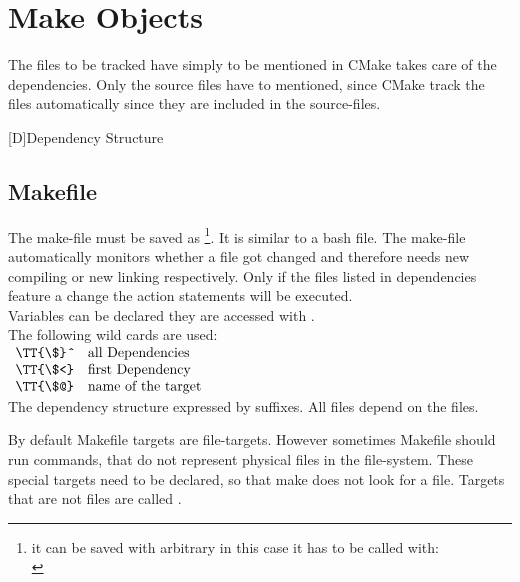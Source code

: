 
\chapter{Make Objects}
The files to be tracked have simply to be mentioned in  CMake takes care of the dependencies. Only the source files  have to mentioned, since CMake track the  files automatically since they are included in the source-files.
\begin{center}

[D]{Dependency Structure}
\end{center}
\TwinLs
{}
{}



\newpage
\section{Makefile}
The make-file must be saved as  \footnote{it can be saved with arbitrary in this case it has to be called with:\\ }. It is similar to a bash file. The make-file automatically monitors whether a file got changed and therefore needs new compiling or new linking respectively.
Only if the files listed in dependencies feature a change the action statements will be executed.\\
Variables can be declared they are accessed with .\\
The following wild cards are used:\\
$ \begin{array}{ll}
\TT{\$} \ \mathtt{\hat{ }} & \text{all Dependencies} \\
\TT{\$<} & \text{first Dependency} \\ 
\TT{\$@} & \text{name of the target}  
\end{array} 
$\\
The dependency structure expressed by suffixes. All  files depend on the  files.

By default Makefile targets are file-targets. However sometimes Makefile should run commands, that do not represent physical files in the file-system. These special targets need to be declared, so that make does not look for a file. Targets that are not files are called .
\newpage

